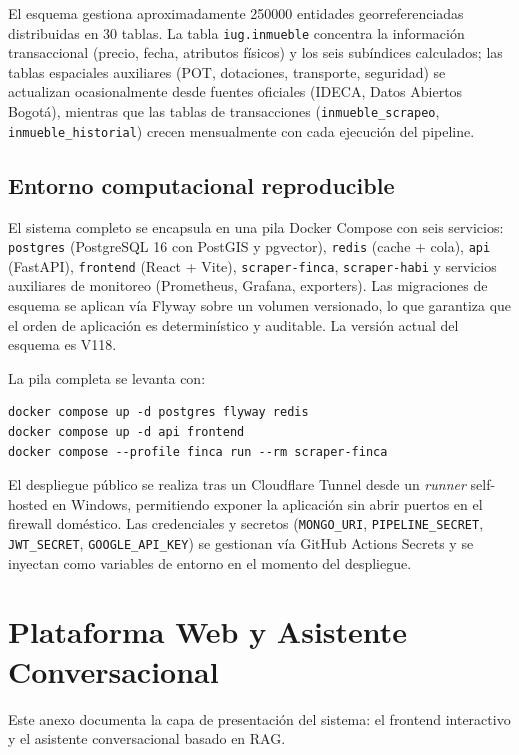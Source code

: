 \documentclass[12pt, a4paper, twoside, openright]{report}
\theoremstyle{plain}
\theoremstyle{definition}
\begin{document}
El esquema gestiona aproximadamente \num{250000} entidades georreferenciadas distribuidas en 30 tablas. La tabla \texttt{iug.inmueble} concentra la información transaccional (precio, fecha, atributos físicos) y los seis subíndices calculados; las tablas espaciales auxiliares (POT, dotaciones, transporte, seguridad) se actualizan ocasionalmente desde fuentes oficiales (IDECA, Datos Abiertos Bogotá), mientras que las tablas de transacciones (\texttt{inmueble\_scrapeo}, \texttt{inmueble\_historial}) crecen mensualmente con cada ejecución del pipeline.

\section{Entorno computacional reproducible}\label{sec:anexo_docker}

El sistema completo se encapsula en una pila Docker Compose con seis servicios: \texttt{postgres} (PostgreSQL 16 con PostGIS y pgvector), \texttt{redis} (cache + cola), \texttt{api} (FastAPI), \texttt{frontend} (React + Vite), \texttt{scraper-finca}, \texttt{scraper-habi} y servicios auxiliares de monitoreo (Prometheus, Grafana, exporters). Las migraciones de esquema se aplican vía Flyway sobre un volumen versionado, lo que garantiza que el orden de aplicación es determinístico y auditable. La versión actual del esquema es V118.

La pila completa se levanta con:
\begin{verbatim}
docker compose up -d postgres flyway redis
docker compose up -d api frontend
docker compose --profile finca run --rm scraper-finca
\end{verbatim}

El despliegue público se realiza tras un Cloudflare Tunnel desde un \emph{runner} self-hosted en Windows, permitiendo exponer la aplicación sin abrir puertos en el firewall doméstico. Las credenciales y secretos (\texttt{MONGO\_URI}, \texttt{PIPELINE\_SECRET}, \texttt{JWT\_SECRET}, \texttt{GOOGLE\_API\_KEY}) se gestionan vía GitHub Actions Secrets y se inyectan como variables de entorno en el momento del despliegue.



\chapter{Plataforma Web y Asistente Conversacional}\label{ax:plataforma}

Este anexo documenta la capa de presentación del sistema: el frontend interactivo y el asistente conversacional basado en RAG.
\end{document}
